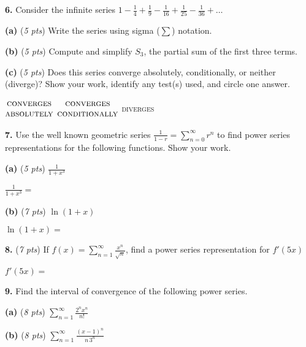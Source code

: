 \documentclass[11pt]{amsart}
\newcommand{\ds}{\displaystyle}
\newcommand{\prob}[1]{\bigskip\noindent\textbf{#1.} }
\newcommand{\pts}[1]{(\emph{#1 pts})}
\newcommand{\probpts}[2]{\prob{#1} \pts{#2} \quad}
\newcommand{\epartpts}[2]{\medskip\noindent \textbf{(#1)} \pts{#2} \quad}
\begin{document}
\clearpage\newpage
\prob{6}  Consider the infinite series $\ds 1-\frac{1}{4}+\frac{1}{9}-\frac{1}{16}+\frac{1}{25} - \frac{1}{36} +\dots$

\epartpts{a}{5}  Write the series using sigma ($\sum$) notation.
\vfill

\epartpts{b}{5}  Compute and simplify $S_3$, the partial sum of the first three terms.
\vfill

\newcommand{\threeopts}{{\small \hspace{-6mm} $\begin{matrix} \text{\textsc{converges}} \\ \text{\textsc{absolutely}} \end{matrix}$ \qquad\qquad $\begin{matrix} \text{\textsc{converges}} \\ \text{\textsc{conditionally}} \end{matrix}$ \qquad\qquad \textsc{diverges}} \bigskip}

\epartpts{c}{5} Does this series converge absolutely, conditionally, or neither (diverge)?  Show your work, identify any test(s) used, and circle one answer. 
\vfill

\threeopts


\clearpage\newpage
\prob{7}  Use the well known geometric series $\ds \frac{1}{1-r}=\sum_{n=0}^\infty r^n$ to find power series representations for the following functions.  Show your work.

\epartpts{a}{5}  $\ds \frac{1}{1+x^3}$

\vspace{1.4in}

\noindent $\ds \frac{1}{1+x^3}=$
\vspace{0.3in}

\epartpts{b}{7}  $\ds \ln(1+x)$

\vfill

\noindent $\ds \ln(1+x) =$
\vspace{0.3in}

\probpts{8}{7} If $\ds f(x)=\sum_{n=1}^\infty \frac{x^n}{\sqrt{n}}$, find a power series representation for $f'(5x)$

\vfill

\noindent $f'(5x)=$


\clearpage\newpage
\prob{9}  Find the interval of convergence of the following power series.

\epartpts{a}{8}  $\ds \sum_{n=1}^\infty \frac{2^nx^n}{n!}$
\vfill

\epartpts{b}{8}  $\ds \sum_{n=1}^\infty \frac{(x-1)^n}{n\, 3^n}$
\vfill
\end{document}
